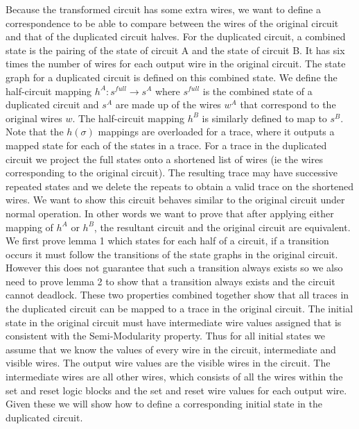 \documentclass{article}
\begin{document}
Because the transformed circuit has some extra wires, we want to define a correspondence to be able to compare between the wires of the original circuit and that of the duplicated circuit halves.  For the duplicated circuit, a combined state is the pairing of the state of circuit A and the state of circuit B. It has six times the number of wires for each output wire in the original circuit.  The state graph for a duplicated circuit is defined on this combined state.  We define the half-circuit mapping $h^A: s^{full} \to s^A$ where $s^{full}$ is the combined state of a duplicated circuit and $s^A$ are made up of the wires $w^A$ that correspond to the original wires $w$.  The half-circuit mapping $h^B$ is similarly defined to map to $s^B$.  Note that the $h(\sigma)$ mappings are overloaded for a trace, where it outputs a mapped state for each of the states in a trace.%
For a trace in the duplicated circuit we project the full states onto a shortened list of wires (ie the wires corresponding to the original circuit). The resulting trace may have successive repeated states and we delete the repeats to obtain a valid trace on the shortened wires.  %
\newline
We want to show this circuit behaves similar to the original circuit under normal operation.  In other words we want to prove that after applying either mapping of $h^A$ or $h^B$, the resultant circuit and the original circuit are equivalent.  We first prove lemma 1 which states for each half of a circuit, if a transition occurs it must follow the transitions of the state graphs in the original circuit.  However this does not guarantee that such a transition always exists so we also need to prove lemma 2 to show that a transition always exists and the circuit cannot deadlock.  These two properties combined together show that all traces in the duplicated circuit can be mapped to a trace in the original circuit.\newline
The initial state in the original circuit must have intermediate wire values assigned that is consistent with the Semi-Modularity property.  Thus for all initial states we assume that we know the values of every wire in the circuit, intermediate and visible wires.  The output wire values are the visible wires in the circuit. The intermediate wires are all other wires, which consists of all the wires within the set and reset logic blocks and the set and reset wire values for each output wire.  Given these we will show how to define a corresponding initial state in the duplicated circuit.  
\end{document}
